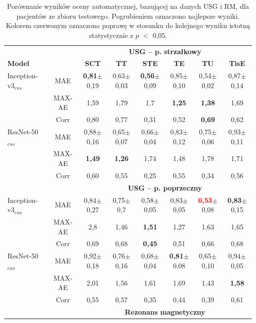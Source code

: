 \begin{enumerate}
 \renewcommand{\arraystretch}{1.2}
 \begin{table}[h!]
 	\scriptsize
 	\setlength{\tabcolsep}{1pt}
 	\centering
 	\caption{Porównanie wyników oceny automatycznej, bazującej na danych USG i RM, dla pacjentów ze zbioru testowego. Pogrubieniem oznaczono najlepsze wyniki. Kolorem czerwonym oznaczono poprawę w stosunku do kolejnego wyniku istotną statystycznie z $p$ $<$ 0,05.}
 	\label{tab:USGvsRM-cross-validation}
 	\begin{tabular}{lc||c|c|c|c|c|c}
 		& & \multicolumn{6}{c}{\textbf{USG -- p. strzałkowy}} \\
 		\textbf{Model} & & \textbf{SCT} & \textbf{TT} & \textbf{STE} & \textbf{TE} & \textbf{TU} & \textbf{TisE} \\ \hline \hline
 		Inception-v3$_{eus}$ & MAE & \textbf{0,81}$\pm$0,19 & 0,63$\pm$0,03 & \textbf{0,56}$\pm$0,09 & 0,85$\pm$0,10 & 0,54$\pm$0,02 & 0,87$\pm$0,14 \\
 		& MAX-AE & 1,59 & 1,79 & 1,7 & \textbf{1,25} & \textbf{1,38} & 1,69 \\
 		& Corr & 0,80 & 0,77 & 0,31 & 0,52 & \textbf{0,69} & 0,62 \\ \hline
 		ResNet-50$_{eus}$ & MAE & 0,88$\pm$0,16 & 0,65$\pm$0,07 & 0,66$\pm$0,04 & 0,83$\pm$0,12 & 0,75$\pm$0,06 & 0,93$\pm$0,11 \\
 		& MAX-AE & \textbf{1,49} & \textbf{1,26} & 1,74 & 1,48 & 1,78 & 1,71 \\
 		& Corr & 0,60 & 0,55 & 0,25 & 0,55 & 0,34 & 0,56 \\
 		\hline \hline
 		& & \multicolumn{6}{c}{\textbf{USG -- p. poprzeczny}} \\
 		
 		Inception-v3$_{euo}$ & MAE & 0,84$\pm$0,27 & 0,75$\pm$0,7 & 0,58$\pm$0,05 & 0,83$\pm$0,05 & \textcolor{red}{\textbf{0,53}}$\pm$0,08 & \textbf{0,83}$\pm$0,15 \\
 		& MAX-AE & 2,8 & 1,46 & \textbf{1,51} & 1,27 & 1,63 & 1,65 \\
 		& Corr & 0,69 & 0,68 & \textbf{0,45} & 0,51 & 0,66 & 0,68 \\ \hline
 		ResNet-50$_{euo}$ & MAE & 0,92$\pm$0,18 & 0,76$\pm$0,16 & 0,68$\pm$0,04 & \textbf{0,81}$\pm$0,08 & 0,65$\pm$0,10 & 0,94$\pm$0,05 \\
 		& MAX-AE & 2,01 & 1,56 & 1,61 & 1,69& 1,43 & \textbf{1,58}\\
 		& Corr & 0,55 & 0,57 & 0,35 & 0,44 & 0,39 & 0,61 \\ \hline \hline
 		& & \multicolumn{6}{c}{\textbf{Rezonans magnetyczny}} \\
 		

\end{tabular}
\end{table}
\end{enumerate}
